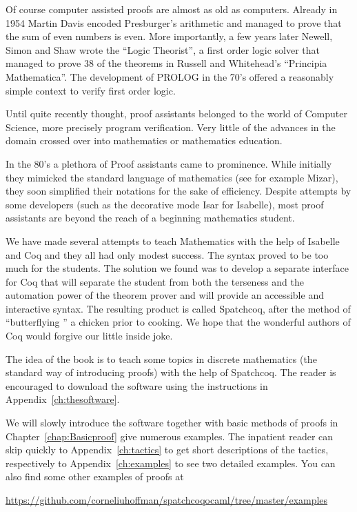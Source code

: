 Of course computer assisted proofs are almost as old as computers. Already in 1954  Martin Davis encoded Presburger's arithmetic and managed to prove that the sum of even numbers is even. More importantly, a few years later  Newell, Simon and  Shaw wrote  the ``Logic Theorist'', a first order logic solver that managed to prove 38 of the theorems in Russell and Whitehead's  ``Principia Mathematica''. The development of PROLOG in the 70's offered a reasonably simple context to verify first order logic.

Until quite recently thought, proof assistants belonged to the world of Computer Science, more precisely program verification. Very little of the advances in the domain crossed over into mathematics or mathematics education.

In the 80's a plethora of Proof assistants came to prominence. While initially they	 mimicked the standard language of mathematics (see for example Mizar), they soon simplified  their notations for the sake of efficiency. Despite attempts by some developers (such as the decorative mode Isar for Isabelle), most proof assistants are beyond the reach of a beginning mathematics student.


We have made several attempts to teach Mathematics with the help of Isabelle and Coq and they all had only modest success. The syntax proved to be too much for the students. The solution we found was to develop a separate interface for Coq that will separate the student from both the terseness and the automation power of the theorem prover and will provide an accessible and interactive syntax. The resulting product is called Spatchcoq, after the method of ``butterflying '' a chicken prior to cooking. We hope that the wonderful authors of Coq would forgive our little inside joke.

The idea of the book is to teach some topics in discrete mathematics (the standard way of introducing proofs) with the help of Spatchcoq. The reader is encouraged to download the software using the instructions in Appendix~\ref{ch:thesoftware}. 


 We will slowly introduce the software together with basic methods of proofs in Chapter~\ref{chap:Basicproof} give numerous examples. The inpatient reader can skip quickly to Appendix~\ref{ch:tactics} to get short descriptions of the tactics, respectively to Appendix~\ref{ch:examples} to see two detailed examples. You can also find some other examples of proofs at 
 
 \url{https://github.com/corneliuhoffman/spatchcoqocaml/tree/master/examples}
